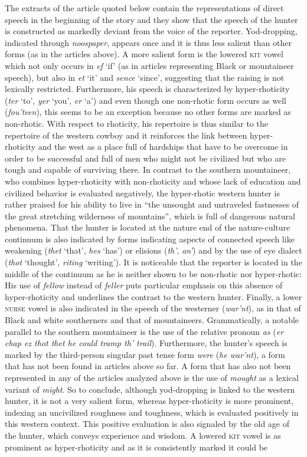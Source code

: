 The extracts of the article quoted below contain the representations of direct speech in the beginning of the story and they show that the speech of the hunter is constructed as markedly deviant from the voice of the reporter. Yod-dropping, indicated through \emph{noospaper}, appears once and it is thus less salient than other forms (as in the articles above). A more salient form is the lowered \textsc{kit} vowel which not only occurs in \emph{ef} ‘if’ (as in articles representing Black or mountaineer speech), but also in \emph{et} ‘it’ and \emph{sence} ‘since’, suggesting that the raising is not lexically restricted. Furthermore, his speech is characterized by hyper-rhoticity (\emph{ter} ‘to’, \emph{yer} ‘you’, \emph{er} ‘a’) and even though one non-rhotic form occurs as well (\emph{fou’teen}), this seems to be an exception because no other forms are marked as non-rhotic. With respect to rhoticity, his repertoire is thus similar to the repertoire of the western cowboy and it reinforces the link between hyper-rhoticity and the west as a place full of hardships that have to be overcome in order to be successful and full of men who might not be civilized but who are tough and capable of surviving there. In contrast to the southern mountaineer, who combines hyper-rhoticity with non-rhoticity and whose lack of education and civilized behavior is evaluated negatively, the hyper-rhotic western hunter is rather praised for his ability to live in “the unsought and untraveled fastnesses of the great stretching wilderness of mountains”, which is full of dangerous natural phenomena. That the hunter is located at the nature end of the nature-culture continuum is also indicated by forms indicating aspects of connected speech like weakening (\emph{thet} ‘that’, \emph{hes} ‘has’) or elisions (\emph{th’}, \emph{an’}) and by the use of eye dialect (\emph{thot} ‘thought’, \emph{riting} ‘writing’). It is noticeable that the reporter is located in the middle of the continuum as he is neither shown to be non-rhotic nor hyper-rhotic: His use of \emph{fellow} instead of \emph{feller} puts particular emphasis on this absence of hyper-rhoticity and underlines the contrast to the western hunter. Finally, a lower \textsc{nurse} vowel is also indicated in the speech of the westerner (\emph{war’nt}), as in that of Black and white southerners and that of mountaineers. Grammatically, a notable parallel to the southern mountaineer is the use of the relative pronoun \emph{as} (\emph{er chap ez thot thet he could tramp th’ trail}). Furthermore, the hunter’s speech is marked by the third-person singular past tense form \emph{were} (\emph{he war’nt}), a form that has not been found in articles above so far. A form that has also not been represented in any of the articles analyzed above is the use of \emph{mought} as a lexical variant of \emph{might}. So to conclude, although yod-dropping is linked to the western hunter, it is not a very salient form, whereas hyper-rhoticity is more prominent, indexing an uncivilized roughness and toughness, which is evaluated positively in this western context. This positive evaluation is also signaled by the old age of the hunter, which conveys experience and wisdom. A lowered \textsc{kit} vowel is as prominent as hyper-rhoticity and as it is consistently marked it could be 